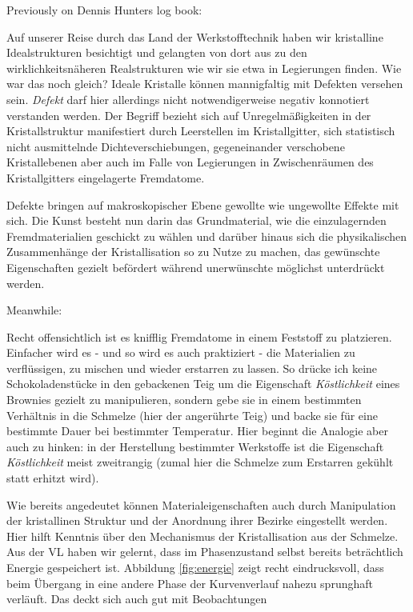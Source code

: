 
Previously on Dennis Hunters log book:
\par\medskip
\energie{}Auf unserer Reise durch das Land der Werkstofftechnik haben wir kristalline Idealstrukturen besichtigt und gelangten von dort aus zu den wirklichkeitsnäheren
Realstrukturen wie wir sie etwa in Legierungen finden. Wie war das noch gleich? Ideale Kristalle können mannigfaltig mit Defekten versehen sein. \textit{Defekt} darf hier allerdings nicht
notwendigerweise negativ konnotiert verstanden werden. Der Begriff bezieht sich auf Unregelmäßigkeiten in der Kristallstruktur manifestiert durch Leerstellen im
Kristallgitter, sich statistisch nicht ausmittelnde Dichteverschiebungen, gegeneinander verschobene Kristallebenen aber auch im Falle von Legierungen in Zwischenräumen
des Kristallgitters eingelagerte Fremdatome.
\par
Defekte bringen auf makroskopischer Ebene gewollte wie ungewollte Effekte mit sich. Die Kunst besteht nun darin das Grundmaterial, wie die einzulagernden Fremdmaterialien
geschickt zu wählen und darüber hinaus sich die physikalischen Zusammenhänge der Kristallisation so zu Nutze zu machen, das gewünschte Eigenschaften gezielt befördert
während unerwünschte möglichst unterdrückt werden.\wasser{}
\par\medskip
Meanwhile:\par\medskip
Recht offensichtlich ist es knifflig Fremdatome in einem Feststoff zu platzieren. Einfacher wird es - und so wird es auch praktiziert - die Materialien zu verflüssigen, zu mischen
und wieder erstarren zu lassen. So drücke ich keine Schokoladenstücke in den gebackenen Teig um die Eigenschaft \textit{Köstlichkeit} eines Brownies gezielt zu manipulieren,
sondern gebe sie in einem bestimmten Verhältnis in die Schmelze (hier der angerührte Teig) und backe sie für eine bestimmte Dauer bei bestimmter Temperatur. Hier beginnt die Analogie
aber auch zu hinken: in der Herstellung bestimmter Werkstoffe ist die Eigenschaft \textit{Köstlichkeit} meist zweitrangig (zumal hier die Schmelze zum Erstarren gekühlt statt erhitzt wird).
\par\medskip
Wie bereits angedeutet können Materialeigenschaften auch durch Manipulation der kristallinen Struktur und der Anordnung ihrer Bezirke eingestellt werden. Hier hilft Kenntnis
über den Mechanismus der Kristallisation aus der Schmelze. Aus der VL haben wir gelernt, dass im Phasenzustand selbst bereits beträchtlich Energie gespeichert ist.
Abbildung \ref{fig:energie} zeigt recht eindrucksvoll, dass beim Übergang in eine andere Phase der Kurvenverlauf nahezu sprunghaft verläuft. Das deckt sich auch gut mit Beobachtungen
